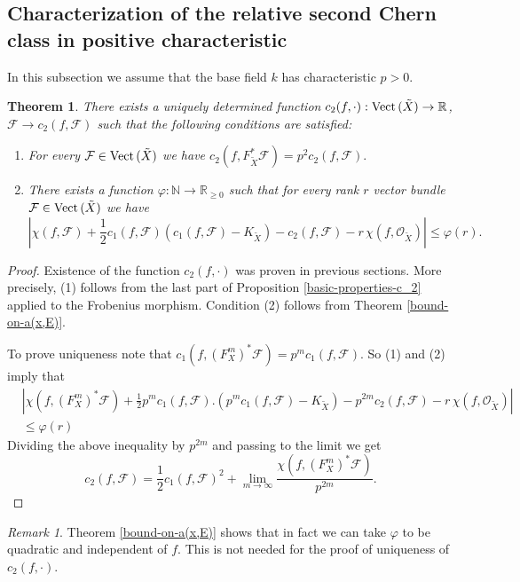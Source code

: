\documentclass[twoside, 11pt]{article}
\theoremstyle{plain}
\newtheorem{Theorem}[Thm]{\sc Theorem}
\theoremstyle{definition}
\theoremstyle{remark}
\newtheorem{Remark}[Thm]{Remark}
\newcommand{\NN}{{\mathbb N}}
\newcommand{\RR}{{\mathbb R}}
\newcommand{\cF}{{\mathcal F}}
\newcommand{\cO}{{\mathcal O}}
\newcommand{\Vect}{{\mathop{{\rm Vect \,}}}}
\begin{document}
\subsection{Characterization of the relative second Chern class in positive characteristic}

In this subsection we assume that the base field $k$ has characteristic $p>0$.

\begin{Theorem}
There exists a uniquely determined function $c_2(f, \cdot ): \Vect (\tilde X) \to \RR$, $\cF\to c_2 (f,\cF)$ such that  the following conditions are satisfied:
\begin{enumerate}
\item For every $\cF\in  \Vect (\tilde X)  $ we have
 $c_2 (f, F_{\tilde X}^{*} \cF)=p^{2} c_2 (f, \cF ).$
\item There exists a function $\varphi: \NN\to \RR _{\ge 0}$  such that
for every rank $r$ vector bundle $\cF\in  \Vect (\tilde X)  $ we have
$$\left|\chi (f, \cF) +\frac{1}{2}c_1(f,  \cF)(c_1(f,  \cF)-K_{\tilde X})-c_2 (f,  \cF) -
r\, \chi(f,\cO_{\tilde X})\right|\le \varphi  (r) .
$$
\end{enumerate}
\end{Theorem}

\begin{proof}
Existence of the function $c_2(f, \cdot )$ was proven in previous sections. More precisely, (1)
follows from the last part of Proposition \ref{basic-properties-c_2} applied to the Frobenius morphism.
Condition (2) follows from Theorem \ref{bound-on-a(x,E)}. 

To prove uniqueness note that $c_1(f, (F_X^{m})^{*} \cF) =p^m c_1(f, \cF)$. So  (1) and (2) imply that
\begin{align*}
&\left| \chi (f, (F_X^{m})^{*} \cF)  +\frac {1}{2}p^mc_1 (f,\cF). (p^mc_1(f,\cF) -K_{\tilde X})-p^{2m} c_2 (f,\cF) -r\, 
\chi (f, \cO_{\tilde X}) \right| \\
&\le \varphi (r)
\end{align*}
Dividing the above inequality by $p^{2m}$ and passing to the limit we get
$$c_2 (f, \cF) = \frac{1}{2} c_1(f, \cF)^2+\lim _{m\to \infty} \frac{\chi (f, (F_X^{m})^{*} \cF )}{p^{2m}}.$$
\end{proof}

\begin{Remark}
	Theorem  \ref{bound-on-a(x,E)} shows that in fact we can take $\varphi$ to be quadratic and independent of $f$. This is not needed for the proof of uniqueness of $c_2(f, \cdot )$.
\end{Remark}
\end{document}
